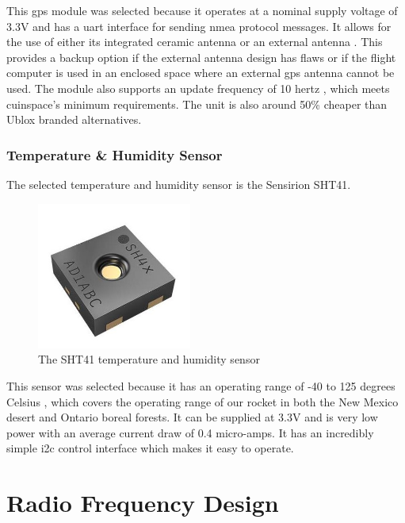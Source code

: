 This \gls{gps} module was selected because it operates at a nominal supply voltage of 3.3V \cite{gps-datasheet} and has
a \gls{uart} interface for sending \gls{nmea} protocol messages. \cite{gps-datasheet} It allows for the use of either
its integrated ceramic antenna or an external antenna \cite{gps-datasheet}. This provides a backup option if the
external antenna design has flaws or if the flight computer is used in an enclosed space where an external \gls{gps}
antenna cannot be used. The module also supports an update frequency of 10 hertz \cite{gps-datasheet}, which meets
\gls{cuinspace}'s minimum requirements. The unit is also around 50\% cheaper than Ublox branded alternatives.

\subsubsection{Temperature \& Humidity Sensor}

The selected temperature and humidity sensor is the Sensirion SHT41.

\begin{figure}[H]
    \centering
    \includegraphics[width=2in]{assets/images/sht41.jpg}
    \caption{The SHT41 temperature and humidity sensor \cite{sht41-pic}}
\end{figure}

This sensor was selected because it has an operating range of -40 to 125 degrees Celsius \cite[1]{sht4x-datasheet},
which covers the operating range of our rocket in both the New Mexico desert and Ontario boreal forests. It can be
supplied at 3.3V \cite[1]{sht4x-datasheet} and is very low power with an average current draw of 0.4 micro-amps.
\cite[1]{sht4x-datasheet} It has an incredibly simple \gls{i2c} control interface which makes it easy to operate.
\cite[Sec. 4.5]{sht4x-datasheet}

\section{Radio Frequency Design}

